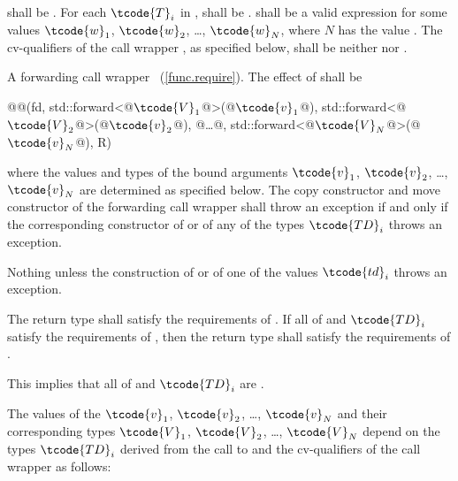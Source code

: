 \begin{itemdescr}
\pnum
\requires
{} shall be . For each $\tcode{T}_i$
in ,  shall be .
 shall be  a valid
expression for some
values $\tcode{w}_1$, $\tcode{w}_2$, \ldots, $\tcode{w}_N$, where
$N$ has the value .
The cv-qualifiers \cv{} of the call wrapper ,
as specified below, shall be neither  nor .

\pnum
\returns
A forwarding call wrapper ~(\ref{func.require}).
The effect of
 shall be
\begin{codeblock}
@@(fd, std::forward<@$\tcode{V}_1$@>(@$\tcode{v}_1$@), std::forward<@$\tcode{V}_2$@>(@$\tcode{v}_2$@), @\ldots @, std::forward<@$\tcode{V}_N$@>(@$\tcode{v}_N$@), R)
\end{codeblock}
where the values and types of the bound
arguments $\tcode{v}_1$, $\tcode{v}_2$, \ldots, $\tcode{v}_N$ are determined as specified below.
The copy constructor and move constructor of the forwarding call wrapper shall throw an
exception if and only if the corresponding constructor of  or of any of the types
$\tcode{TD}_i$ throws an exception.

\pnum
\throws Nothing unless the construction of
 or of one of the values $\tcode{td}_i$ throws an exception.

\pnum
\remarks The return type shall satisfy the requirements of . If all
of  and $\tcode{TD}_i$ satisfy the requirements of , then the
return type shall satisfy the requirements of . \begin{note} This implies
that all of  and $\tcode{TD}_i$ are . \end{note}
\end{itemdescr}

\pnum
{}%
The values of the  $\tcode{v}_1$, $\tcode{v}_2$, \ldots, $\tcode{v}_N$ and their
corresponding types $\tcode{V}_1$, $\tcode{V}_2$, \ldots, $\tcode{V}_N$ depend on the
types $\tcode{TD}_i$ derived from
the call to  and the
cv-qualifiers \cv{} of the call wrapper  as follows:

